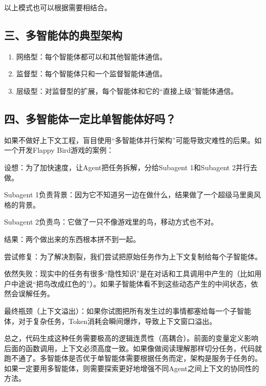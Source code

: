 以上模式也可以根据需要相结合。

\hypertarget{ux4e09ux591aux667aux80fdux4f53ux7684ux5178ux578bux67b6ux6784}{%
\subsection{三、多智能体的典型架构}\label{ux4e09ux591aux667aux80fdux4f53ux7684ux5178ux578bux67b6ux6784}}

\begin{enumerate}
\def\labelenumi{\arabic{enumi}.}
\item
  网络型：每个智能体都可以和其他智能体通信。
\item
  监督型：每个智能体只和一个监督智能体通信。
\item
  层级型：对监督型的扩展，每个智能体和它的``直接上级''智能体通信。
\end{enumerate}

\hypertarget{ux56dbux591aux667aux80fdux4f53ux4e00ux5b9aux6bd4ux5355ux667aux80fdux4f53ux597dux5417}{%
\subsection{四、多智能体一定比单智能体好吗？}\label{ux56dbux591aux667aux80fdux4f53ux4e00ux5b9aux6bd4ux5355ux667aux80fdux4f53ux597dux5417}}

如果不做好上下文工程，盲目使用``多智能体并行架构''可能导致灾难性的后果。如一个开发Flappy Bird游戏的案例：

设想：为了加快速度，让Agent把任务拆解，分给Subagent 1和Subagent 2并行去做。

Subagent 1负责背景：因为它不知道另一边在做什么，结果做了一个超级马里奥风格的背景。

Subagent 2负责鸟：它做了一只不像游戏里的鸟，移动方式也不对。

结果：两个做出来的东西根本拼不到一起。

尝试修复：为了解决割裂，我们尝试把原始任务作为上下文复制给每个子智能体。

依然失败：现实中的任务有很多``隐性知识''是在对话和工具调用中产生的（比如用户中途说``把鸟改成红色的''）。如果子智能体看不到这些动态产生的中间状态，依然会误解任务。

最终瓶颈（上下文溢出）：如果你试图把所有发生过的事情都塞给每一个子智能体，对于复杂任务，Token消耗会瞬间爆炸，导致上下文窗口溢出。

总之，代码生成这种任务需要极高的逻辑连贯性（高耦合）。前面的变量定义影响后面的函数调用，上下文必须高度一致。如果像做阅读理解那样切分任务，代码就跑不通了。多智能体是否优于单智能体需要根据任务而定，架构是服务于任务的。如果一定要用多智能体，则需要探索更好地增强不同Agent之间上下文的协同性的方法。

